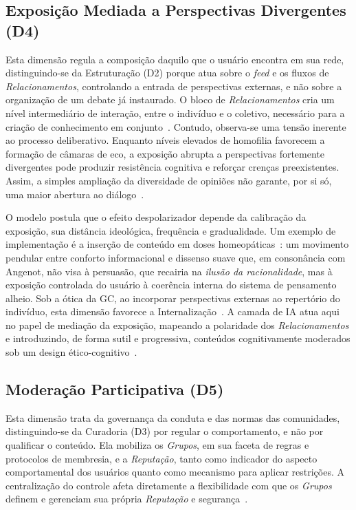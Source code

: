 \documentclass[conference]{IEEEtran} \IEEEoverridecommandlockouts %
\begin{document}
\subsection{Exposição Mediada a Perspectivas Divergentes (D4)}

Esta dimensão regula a composição daquilo que o usuário encontra em sua rede, distinguindo-se da Estruturação (D2) porque atua sobre o \textit{feed} e os fluxos de \textit{Relacionamentos}, controlando a entrada de perspectivas externas, e não sobre a organização de um debate já instaurado. O bloco de \textit{Relacionamentos} cria um nível intermediário de interação, entre o indivíduo e o coletivo, necessário para a criação de conhecimento em conjunto~\cite{sigalaKnowledgeManagementSocial2015a}. Contudo, observa-se uma tensão inerente ao processo deliberativo. Enquanto níveis elevados de homofilia favorecem a formação de câmaras de eco, a exposição abrupta a perspectivas fortemente divergentes pode produzir resistência cognitiva e reforçar crenças preexistentes. Assim, a simples ampliação da diversidade de opiniões não garante, por si só, uma maior abertura ao diálogo~\cite{pimentelEvaluationCollaborativeCuration2018, alatawiSurveyEchoChambers2021}. 

O modelo postula que o efeito despolarizador depende da calibração da exposição, sua distância ideológica, frequência e gradualidade. Um exemplo de implementação é a inserção de conteúdo em doses homeopáticas~\cite{pimentelEstrategiaEspiralReforco2024}: um movimento pendular entre conforto informacional e dissenso suave que, em consonância com Angenot, não visa à persuasão, que recairia na \textit{ilusão da racionalidade}, mas à exposição controlada do usuário à coerência interna do sistema de pensamento alheio. Sob a ótica da GC, ao incorporar perspectivas externas ao repertório do indivíduo, esta dimensão favorece a Internalização~\cite{nonaka1994dynamic}. A camada de IA atua aqui no papel de mediação da exposição, mapeando a polaridade dos \textit{Relacionamentos} e introduzindo, de forma sutil e progressiva, conteúdos cognitivamente moderados sob um design ético-cognitivo~\cite{schneiderAImediatedCollaborativeCrowdsourcing2025, pimentelEvaluationCollaborativeCuration2018}.

\subsection{Moderação Participativa (D5)}

Esta dimensão trata da governança da conduta e das normas das comunidades, distinguindo-se da Curadoria (D3) por regular o comportamento, e não por qualificar o conteúdo. Ela mobiliza os \textit{Grupos}, em sua faceta de regras e protocolos de membresia, e a \textit{Reputação}, tanto como indicador do aspecto comportamental dos usuários quanto como mecanismo para aplicar restrições. A centralização do controle afeta diretamente a flexibilidade com que os \textit{Grupos} definem e gerenciam sua própria \textit{Reputação} e segurança~\cite{kietzmannSocialMediaGet2011}.
\end{document}
